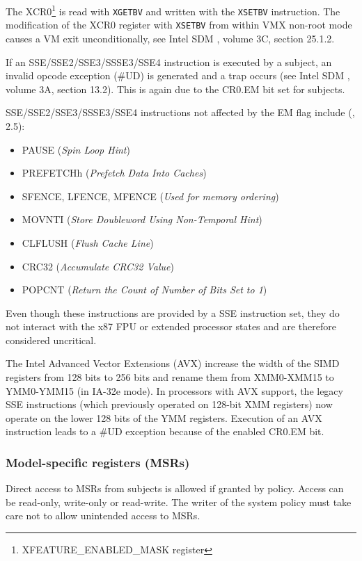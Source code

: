The XCR0\footnote{XFEATURE\_ENABLED\_MASK register} is read with
\texttt{XGETBV} and written with the \texttt{XSETBV} instruction. The
modification of the XCR0 register with \texttt{XSETBV} from within VMX non-root
mode causes a VM exit unconditionally, see Intel SDM \cite{IntelSDM}, volume
3C, section 25.1.2.

If an SSE/SSE2/SSE3/SSSE3/SSE4 instruction is executed by a subject, an invalid
opcode exception (\#UD) is generated and a trap occurs (see Intel SDM
\cite{IntelSDM}, volume 3A, section 13.2). This is again due to the CR0.EM bit
set for subjects.

SSE/SSE2/SSE3/SSSE3/SSE4 instructions not affected by the EM flag include
(\cite{IntelSDM}, 2.5):
\begin{itemize}
	\item PAUSE (\emph{Spin Loop Hint})
	\item PREFETCHh (\emph{Prefetch Data Into Caches})
	\item SFENCE, LFENCE, MFENCE (\emph{Used for memory ordering})
	\item MOVNTI (\emph{Store Doubleword Using Non-Temporal Hint})
	\item CLFLUSH (\emph{Flush Cache Line})
	\item CRC32 (\emph{Accumulate CRC32 Value})
	\item POPCNT (\emph{Return the Count of Number of Bits Set to 1})
\end{itemize}

Even though these instructions are provided by a SSE instruction set, they do
not interact with the x87 FPU or extended processor states and are therefore
considered uncritical.

The Intel Advanced Vector Extensions (AVX) increase the width of the
SIMD registers from 128 bits to 256 bits and rename them from XMM0-XMM15 to
YMM0-YMM15 (in IA-32e mode). In processors with AVX support, the legacy SSE
instructions (which previously operated on 128-bit XMM registers) now operate on
the lower 128 bits of the YMM registers. Execution of an AVX instruction leads
to a \#UD exception because of the enabled CR0.EM bit.

\subsubsection{Model-specific registers (MSRs)}
Direct access to MSRs from subjects is allowed if granted by policy. Access can
be read-only, write-only or read-write. The writer of the system policy must
take care not to allow unintended access to MSRs.

